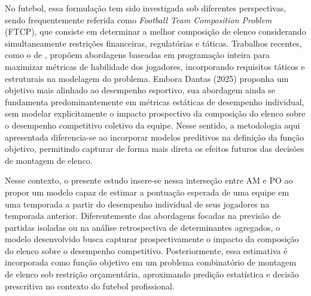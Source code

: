 No futebol, essa formulação tem sido investigada sob diferentes perspectivas, sendo frequentemente referida como \textit{Football Team Composition Problem} (FTCP), 
que consiste em determinar a melhor composição de elenco considerando simultaneamente restrições financeiras, regulatórias e táticas. 
Trabalhos recentes, como o de \cite{Dantas2025}, propõem abordagens baseadas em programação inteira para maximizar métricas de habilidade dos jogadores, 
incorporando requisitos táticos e estruturais na modelagem do problema. Embora Dantas (2025) proponha um objetivo mais alinhado ao desempenho esportivo, 
sua abordagem ainda se fundamenta predominantemente em métricas estáticas de desempenho individual, sem modelar explicitamente o impacto prospectivo da 
composição do elenco sobre o desempenho competitivo coletivo da equipe. Nesse sentido, a metodologia aqui apresentada diferencia-se ao incorporar modelos 
preditivos na definição da função objetivo, permitindo capturar de forma mais direta os efeitos futuros das decisões de montagem de elenco.

Nesse contexto, o presente estudo insere-se nessa interseção entre AM e PO ao propor um modelo capaz de estimar a pontuação esperada de uma equipe em uma temporada 
a partir do desempenho individual de seus jogadores na temporada anterior. Diferentemente das abordagens focadas na previsão de partidas isoladas ou 
na análise retrospectiva de determinantes agregados, o modelo desenvolvido busca capturar prospectivamente o impacto da composição do elenco 
sobre o desempenho competitivo. Posteriormente, essa estimativa é incorporada como função objetivo em um problema combinatório de montagem de elenco 
sob restrição orçamentária, aproximando predição estatística e decisão prescritiva no contexto do futebol profissional.